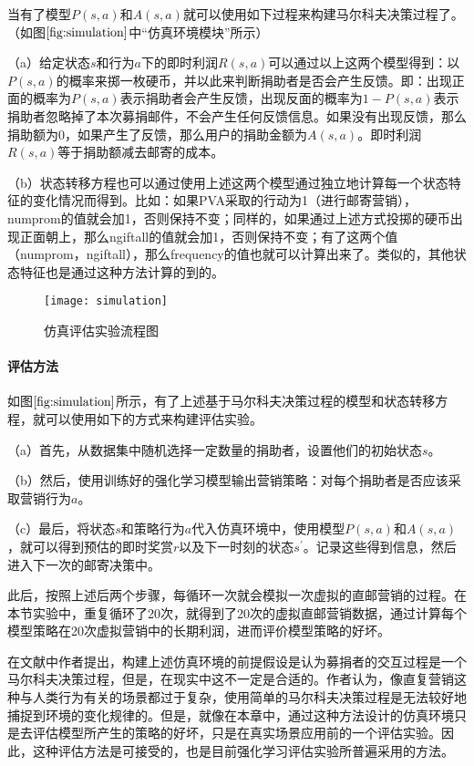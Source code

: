 当有了模型$P(s,a)$和$A(s,a)$就可以使用如下过程来构建马尔科夫决策过程了。（如图$\ref{fig:simulation}$中“仿真环境模块”所示）

（a）给定状态$s$和行为$a$下的即时利润$R(s,a)$可以通过以上这两个模型得到：以$P(s,a)$的概率来掷一枚硬币，并以此来判断捐助者是否会产生反馈。即：出现正面的概率为$P(s,a)$表示捐助者会产生反馈，出现反面的概率为$1-P(s,a)$表示捐助者忽略掉了本次募捐邮件，不会产生任何反馈信息。如果没有出现反馈，那么捐助额为$0$，如果产生了反馈，那么用户的捐助金额为$A(s,a)$。即时利润$R(s,a)$等于捐助额减去邮寄的成本。

（b）状态转移方程也可以通过使用上述这两个模型通过独立地计算每一个状态特征的变化情况而得到。比如：如果PVA采取的行动为1（进行邮寄营销），numprom的值就会加1，否则保持不变；同样的，如果通过上述方式投掷的硬币出现正面朝上，那么ngiftall的值就会加1，否则保持不变；有了这两个值（numprom，ngiftall），那么frequency的值也就可以计算出来了。类似的，其他状态特征也是通过这种方法计算的到的。

\begin{figure}[htbp]
\centering
\texttt{[image: simulation]}
\caption{仿真评估实验流程图}
\label{fig:simulation}
\end{figure}

\paragraph{评估方法}
如图$\ref{fig:simulation}$所示，有了上述基于马尔科夫决策过程的模型和状态转移方程，就可以使用如下的方式来构建评估实验。

（a）首先，从数据集中随机选择一定数量的捐助者，设置他们的初始状态$s$。

（b）然后，使用训练好的强化学习模型输出营销策略：对每个捐助者是否应该采取营销行为$a$。

（c）最后，将状态$s$和策略行为$a$代入仿真环境中，使用模型$P(s,a)$和$A(s,a)$，就可以得到预估的即时奖赏$r$以及下一时刻的状态$s^{'}$。记录这些得到信息，然后进入下一次的邮寄决策中。

此后，按照上述后两个步骤，每循环一次就会模拟一次虚拟的直邮营销的过程。在本节实验中，重复循环了20次，就得到了20次的虚拟直邮营销数据，通过计算每个模型策略在20次虚拟营销中的长期利润，进而评价模型策略的好坏。

在文献\citep{pednault2002sequential}中作者提出，构建上述仿真环境的前提假设是认为募捐者的交互过程是一个马尔科夫决策过程，但是，在现实中这不一定是合适的。作者认为，像直复营销这种与人类行为有关的场景都过于复杂，使用简单的马尔科夫决策过程是无法较好地捕捉到环境的变化规律的。但是，就像在本章中，通过这种方法设计的仿真环境只是去评估模型所产生的策略的好坏，只是在真实场景应用前的一个评估实验。因此，这种评估方法是可接受的，也是目前强化学习评估实验所普遍采用的方法。

